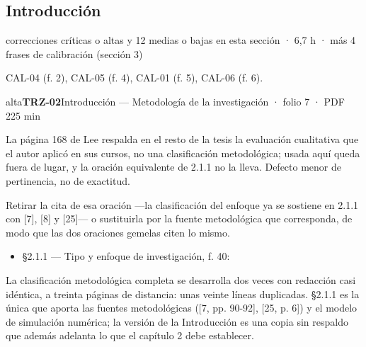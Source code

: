 \subsection{Introducción}
{\small\color{gris} correcciones críticas o altas y 12 medias o bajas en esta sección · 6,7 h · más 4 frases de calibración (sección 3)}\par
{\small{}CAL-04 (f. 2), CAL-05 (f. 4), CAL-01 (f. 5), CAL-06 (f. 6).\par}
\begin{ficha}{alta}{\casilla\textbf{TRZ-02}\quad{}\quad Introducción — Metodología de la investigación · folio 7 · PDF 22\hfill 5 min}
\par
{}La página 168 de Lee respalda en el resto de la tesis la evaluación cualitativa que el autor aplicó en sus cursos, no una clasificación metodológica; usada aquí queda fuera de lugar, y la oración equivalente de 2.1.1 no la lleva. Defecto menor de pertinencia, no de exactitud.\par
{}Retirar la cita de esa oración —la clasificación del enfoque ya se sostiene en 2.1.1 con [7]\allowbreak{}, [8]\allowbreak{} y [25]\allowbreak{}— o sustituirla por la fuente metodológica que corresponda, de modo que las dos oraciones gemelas citen lo mismo.\par
{}\begin{itemize}[leftmargin=1.2em,itemsep=1pt,topsep=1pt]
\item {\small §2.1.1 — Tipo y enfoque de investigación, f. 40: }
\end{itemize}
{\small\color{gris}La clasificación metodológica completa se desarrolla dos veces con redacción casi idéntica, a treinta páginas de distancia: unas veinte líneas duplicadas. §2.1.1 es la única que aporta las fuentes metodológicas ([7, pp. 90-92]\allowbreak{}, [25, p. 6]\allowbreak{}) y el modelo de simulación numérica; la versión de la Introducción es una copia sin respaldo que además adelanta lo que el capítulo 2 debe establecer.\par}
\end{ficha}
